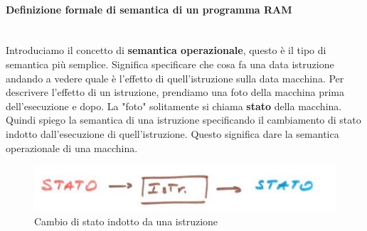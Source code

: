 \documentclass{article}
\begin{document}
\paragraph{Definizione formale di semantica di un programma RAM}\mbox{}\\
Introduciamo il concetto di \textbf{semantica operazionale}, questo è il tipo di semantica
più semplice. Significa specificare che cosa fa una data istruzione andando a vedere quale
è l'effetto di quell'istruzione sulla data macchina.
\newline\newline
Per descrivere l'effetto di un istruzione, prendiamo una foto della macchina prima dell'esecuzione
e dopo. La "foto" solitamente si chiama \textbf{stato} della macchina. Quindi spiego la semantica
di una istruzione specificando il cambiamento di stato indotto dall'esecuzione di quell'istruzione.
Questo significa dare la semantica operazionale di una macchina.
\begin{figure}[H]
    \centering
    \includegraphics[scale=0.5]{images/cambio_stato.png}
    \caption{Cambio di stato indotto da una istruzione}
\end{figure}
\end{document}

